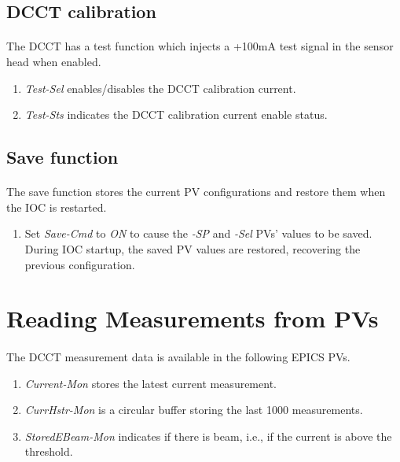 \documentclass[openany]{article}
\begin{document}
	\subsection{DCCT calibration}

		\paragraph{} The DCCT has a test function which injects a +100mA test signal in the sensor head when enabled.

			\begin{enumerate}
				\item \emph{Test-Sel} enables/disables the DCCT calibration current.
				\item \emph{Test-Sts} indicates the DCCT calibration current enable status.
			\end{enumerate}

	\subsection{Save function}

		\paragraph{} The save function stores the current PV configurations and restore them when the IOC is restarted.

			\begin{enumerate}
				\item Set \emph{Save-Cmd} to \emph{ON} to cause the \emph{-SP} and \emph{-Sel} PVs' values to be saved. During IOC startup, the saved PV values are restored, recovering the previous configuration.
			\end{enumerate}

\section{Reading Measurements from PVs}

	\paragraph{} The DCCT measurement data is available in the following EPICS PVs.

		\begin{enumerate}
			\item \emph{Current-Mon} stores the latest current measurement.
			\item \emph{CurrHstr-Mon} is a circular buffer storing the last 1000 measurements.
			\item \emph{StoredEBeam-Mon} indicates if there is beam, i.e., if the current is above the threshold.
		\end{enumerate}
\end{document}
